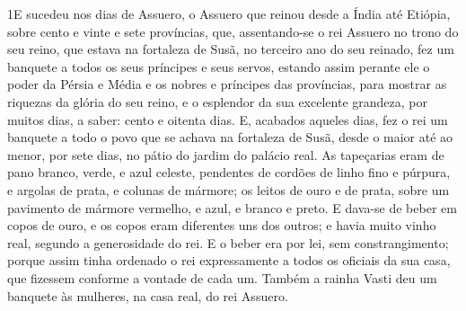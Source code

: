 
\lettrine{1} E sucedeu nos dias de Assuero, o Assuero que
reinou desde a Índia até Etiópia, sobre cento e vinte e sete
províncias, que, assentando-se o rei Assuero no trono do seu
reino, que estava na fortaleza de Susã, no terceiro ano do seu
reinado, fez um banquete a todos os seus príncipes e seus servos,
estando assim perante ele o poder da Pérsia e Média e os nobres e
príncipes das províncias, para mostrar as riquezas da glória do
seu reino, e o esplendor da sua excelente grandeza, por muitos dias,
a saber: cento e oitenta dias. E, acabados aqueles dias, fez o
rei um banquete a todo o povo que se achava na fortaleza de Susã,
desde o maior até ao menor, por sete dias, no pátio do jardim do
palácio real. As tapeçarias eram de pano branco, verde, e azul
celeste, pendentes de cordões de linho fino e púrpura, e argolas de
prata, e colunas de mármore; os leitos de ouro e de prata, sobre um
pavimento de mármore vermelho, e azul, e branco e preto. E
dava-se de beber em copos de ouro, e os copos eram diferentes uns
dos outros; e havia muito vinho real, segundo a generosidade do rei.
E o beber era por lei, sem constrangimento; porque assim tinha
ordenado o rei expressamente a todos os oficiais da sua casa, que
fizessem conforme a vontade de cada um. Também a rainha Vasti
deu um banquete às mulheres, na casa real, do rei Assuero.


